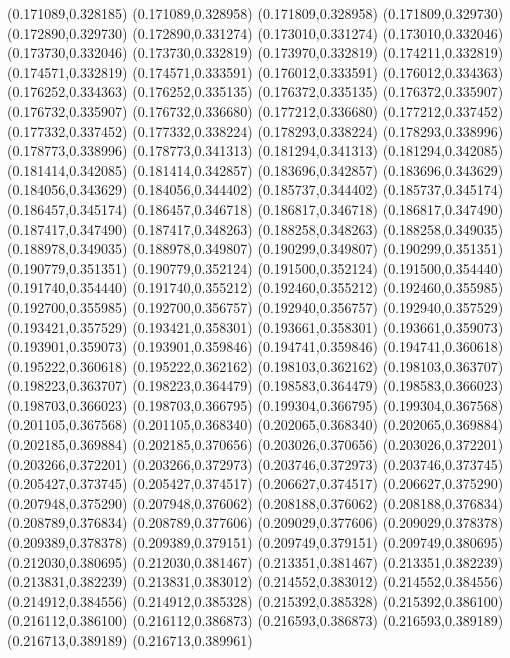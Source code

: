 (0.171089,0.328185)
(0.171089,0.328958)
(0.171809,0.328958)
(0.171809,0.329730)
(0.172890,0.329730)
(0.172890,0.331274)
(0.173010,0.331274)
(0.173010,0.332046)
(0.173730,0.332046)
(0.173730,0.332819)
(0.173970,0.332819)
(0.174211,0.332819)
(0.174571,0.332819)
(0.174571,0.333591)
(0.176012,0.333591)
(0.176012,0.334363)
(0.176252,0.334363)
(0.176252,0.335135)
(0.176372,0.335135)
(0.176372,0.335907)
(0.176732,0.335907)
(0.176732,0.336680)
(0.177212,0.336680)
(0.177212,0.337452)
(0.177332,0.337452)
(0.177332,0.338224)
(0.178293,0.338224)
(0.178293,0.338996)
(0.178773,0.338996)
(0.178773,0.341313)
(0.181294,0.341313)
(0.181294,0.342085)
(0.181414,0.342085)
(0.181414,0.342857)
(0.183696,0.342857)
(0.183696,0.343629)
(0.184056,0.343629)
(0.184056,0.344402)
(0.185737,0.344402)
(0.185737,0.345174)
(0.186457,0.345174)
(0.186457,0.346718)
(0.186817,0.346718)
(0.186817,0.347490)
(0.187417,0.347490)
(0.187417,0.348263)
(0.188258,0.348263)
(0.188258,0.349035)
(0.188978,0.349035)
(0.188978,0.349807)
(0.190299,0.349807)
(0.190299,0.351351)
(0.190779,0.351351)
(0.190779,0.352124)
(0.191500,0.352124)
(0.191500,0.354440)
(0.191740,0.354440)
(0.191740,0.355212)
(0.192460,0.355212)
(0.192460,0.355985)
(0.192700,0.355985)
(0.192700,0.356757)
(0.192940,0.356757)
(0.192940,0.357529)
(0.193421,0.357529)
(0.193421,0.358301)
(0.193661,0.358301)
(0.193661,0.359073)
(0.193901,0.359073)
(0.193901,0.359846)
(0.194741,0.359846)
(0.194741,0.360618)
(0.195222,0.360618)
(0.195222,0.362162)
(0.198103,0.362162)
(0.198103,0.363707)
(0.198223,0.363707)
(0.198223,0.364479)
(0.198583,0.364479)
(0.198583,0.366023)
(0.198703,0.366023)
(0.198703,0.366795)
(0.199304,0.366795)
(0.199304,0.367568)
(0.201105,0.367568)
(0.201105,0.368340)
(0.202065,0.368340)
(0.202065,0.369884)
(0.202185,0.369884)
(0.202185,0.370656)
(0.203026,0.370656)
(0.203026,0.372201)
(0.203266,0.372201)
(0.203266,0.372973)
(0.203746,0.372973)
(0.203746,0.373745)
(0.205427,0.373745)
(0.205427,0.374517)
(0.206627,0.374517)
(0.206627,0.375290)
(0.207948,0.375290)
(0.207948,0.376062)
(0.208188,0.376062)
(0.208188,0.376834)
(0.208789,0.376834)
(0.208789,0.377606)
(0.209029,0.377606)
(0.209029,0.378378)
(0.209389,0.378378)
(0.209389,0.379151)
(0.209749,0.379151)
(0.209749,0.380695)
(0.212030,0.380695)
(0.212030,0.381467)
(0.213351,0.381467)
(0.213351,0.382239)
(0.213831,0.382239)
(0.213831,0.383012)
(0.214552,0.383012)
(0.214552,0.384556)
(0.214912,0.384556)
(0.214912,0.385328)
(0.215392,0.385328)
(0.215392,0.386100)
(0.216112,0.386100)
(0.216112,0.386873)
(0.216593,0.386873)
(0.216593,0.389189)
(0.216713,0.389189)
(0.216713,0.389961)
